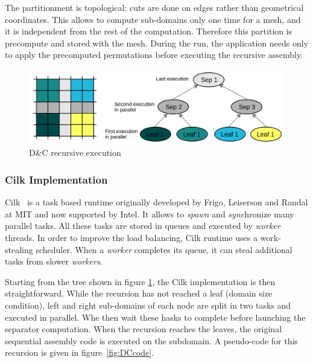 \documentclass{IOS-Book-Article}
\begin{document}
The partitionment is topological: cuts are done on edges rather than geometrical coordinates.
This allows to compute sub-domains only one time for a mesh, and it is independent from the rest of the computation. Therefore this partition is precompute and stored with the mesh.
During the run, the application needs only to apply the precomputed permutations before executing the recursive assembly.
\begin{figure}[htp]
 \centering
 \includegraphics[scale=0.25]{DC_recursion.png}
 \caption{D\&C recursive execution}
 \label{fig:DCrec}
\end{figure}

\subsubsection{Cilk Implementation}
Cilk~\cite{cilk5} is a task based runtime originally developed by Frigo, Leiserson and Randal at MIT and now supported by Intel.
It allows to \emph{spawn} and \emph{sync}hronize many parallel tasks.
All these tasks are stored in queues and executed by \emph{worker} threads.
In order to improve the load balancing, Cilk runtime uses a work-stealing scheduler. When a \emph{worker} completes its queue, it can steal additional tasks from
slower \emph{workers}.

Starting from the tree shown in figure \ref{fig:DCrec}, the Cilk implementation is then straightforward.
While the recursion has not reached a leaf (domain size condition), left and right sub-domains of each node are split in two tasks and executed in parallel. Whe then wait these hasks to complete before launching the separator computation. 
When the recursion reaches the leaves, the original sequential assembly code is executed on the subdomain.
A pseudo-code for this recursion is given in figure~\ref{fig:DCcode}.
\end{document}
